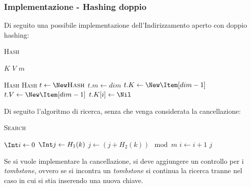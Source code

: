         \subsubsection{Implementazione - Hashing doppio} Di seguito una possibile implementazione dell'Indirizzamento aperto con doppio hashing:
            \begin{algorithm}[H]
                \caption{\textsc{Hash}}
                \begin{algorithmic}
                    \State \Item[] $K$ 
                    \State \Item[] $V$ 
                    \State \Int $m$ 
                    
                    \State \textsc{Hash}
                        \State \textsc{Hash} $t \gets \New \textsc{Hash}$
                        \State $t.m \gets dim$
                        \State $t.K \gets \New \Item[dim-1]$
                        \State $t.V \gets \New \Item[dim-1]$
                            \State $t.K[i] \gets \Nil$
                        \EndFor
                    \EndFunction
                \end{algorithmic}
            \end{algorithm}
            Di seguito l'algoritmo di ricerca, senza che venga considerata la cancellazione:
            \begin{algorithm}[H]
                \caption{\textsc{Search}}
                \begin{algorithmic}
                    \State \Int {}
                        \State $\Int i\gets 0$
                        \State $\Int j\gets H_1(k)$
                            \State $j\gets (j+H_2(k))\mod m$
                            \State $i\gets i+1$
                        \EndWhile
                        \State \Return $j$
                    \EndFunction
                \end{algorithmic}
            \end{algorithm}
            Se si vuole implementare la cancellazione, si deve aggiungere un controllo per i 
            \textit{tombstone}, ovvero se si incontra un \textit{tombstone} si continua la ricerca tranne nel caso in cui si stia inserendo una nuova chiave.
            \newpage
